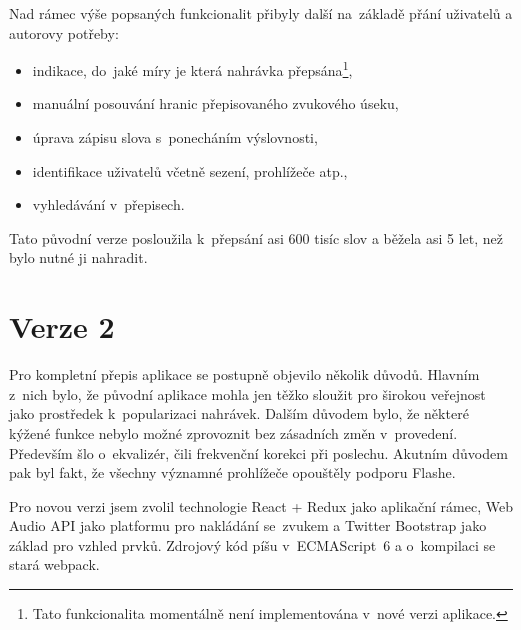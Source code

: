 

Nad rámec výše popsaných funkcionalit přibyly další na~základě přání uživatelů a
autorovy potřeby:

\begin{itemize}
\item{indikace, do~jaké míry je která nahrávka
přepsána\footnote{\label{fn:not-in-v2}Tato
funkcionalita momentálně není implementována v~nové verzi aplikace.},}
\item{manuální posouvání hranic přepisovaného zvukového
úseku,}
\item{úprava zápisu slova s~ponecháním výslovnosti,}
\item{identifikace uživatelů včetně sezení, prohlížeče atp.,}
\item{vyhledávání v~přepisech.}
\end{itemize}

Tato původní verze posloužila k~přepsání asi 600 tisíc slov a běžela asi 5 let,
než bylo nutné ji nahradit.

\section{Verze 2}

Pro kompletní přepis aplikace se postupně objevilo několik důvodů. Hlavním
z~nich bylo, že původní aplikace mohla jen těžko sloužit pro širokou veřejnost
jako prostředek k~popularizaci nahrávek. Dalším důvodem bylo, že některé kýžené
funkce nebylo možné zprovoznit bez zásadních změn v~provedení. Především šlo
o~ekvalizér, čili frekvenční korekci při poslechu. Akutním důvodem pak byl fakt,
že všechny významné prohlížeče opouštěly podporu Flashe.

Pro novou verzi jsem zvolil technologie React + Redux\cite{abramov2015redux} jako aplikační rámec, Web
Audio API\cite{adenot2013web} jako platformu pro nakládání se~zvukem a Twitter Bootstrap jako základ
pro vzhled prvků. Zdrojový kód píšu v~ECMAScript~6 a o~kompilaci se stará
webpack.

